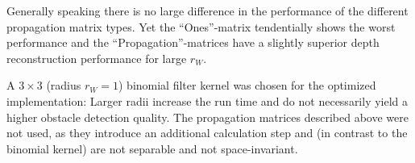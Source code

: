Generally speaking there is no large difference in the performance of the different propagation matrix types. Yet the ``Ones''-matrix tendentially shows the worst performance and the ``Propagation''-matrices have a slightly superior depth reconstruction performance for large $r_W$.

A $3 \times 3$ (radius $r_W = 1$) binomial filter kernel was chosen for the optimized implementation: Larger radii increase the run time and do not necessarily yield a higher obstacle detection quality. The propagation matrices described above were not used, as they introduce an additional calculation step and (in contrast to the binomial kernel) are not separable and not space-invariant.
